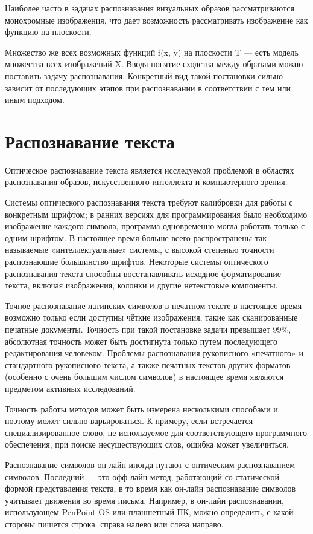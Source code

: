 Наиболее часто в задачах распознавания визуальных образов рассматриваются монохромные изображения, что дает возможность рассматривать изображение как функцию на плоскости.

Множество же всех возможных функций f(x, y) на плоскости T — есть модель множества всех изображений X. Вводя понятие сходства между образами можно поставить задачу распознавания. Конкретный вид такой постановки сильно зависит от последующих этапов при распознавании в соответствии с тем или иным подходом.

\section{Распознавание текста}
Оптическое распознавание текста является исследуемой проблемой в областях распознавания образов, искусственного интеллекта и компьютерного зрения.

Системы оптического распознавания текста требуют калибровки для работы с конкретным шрифтом; в ранних версиях для программирования было необходимо изображение каждого символа, программа одновременно могла работать только с одним шрифтом. В настоящее время больше всего распространены так называемые «интеллектуальные» системы, с высокой степенью точности распознающие большинство шрифтов. Некоторые системы оптического распознавания текста способны восстанавливать исходное форматирование текста, включая изображения, колонки и другие нетекстовые компоненты.

Точное распознавание латинских символов в печатном тексте в настоящее время возможно только если доступны чёткие изображения, такие как сканированные печатные документы. Точность при такой постановке задачи превышает 99\%, абсолютная точность может быть достигнута только путем последующего редактирования человеком. Проблемы распознавания рукописного «печатного» и стандартного рукописного текста, а также печатных текстов других форматов (особенно с очень большим числом символов) в настоящее время являются предметом активных исследований.

Точность работы методов может быть измерена несколькими способами и поэтому может сильно варьироваться. К примеру, если встречается специализированное слово, не используемое для соответствующего программного обеспечения, при поиске несуществующих слов, ошибка может увеличиться.

Распознавание символов он-лайн иногда путают с оптическим распознаванием символов. Последний — это офф-лайн метод, работающий со статической формой представления текста, в то время как он-лайн распознавание символов учитывает движения во время письма. Например, в он-лайн распознавании, использующем PenPoint OS или планшетный ПК, можно определить, с какой стороны пишется строка: справа налево или слева направо.

